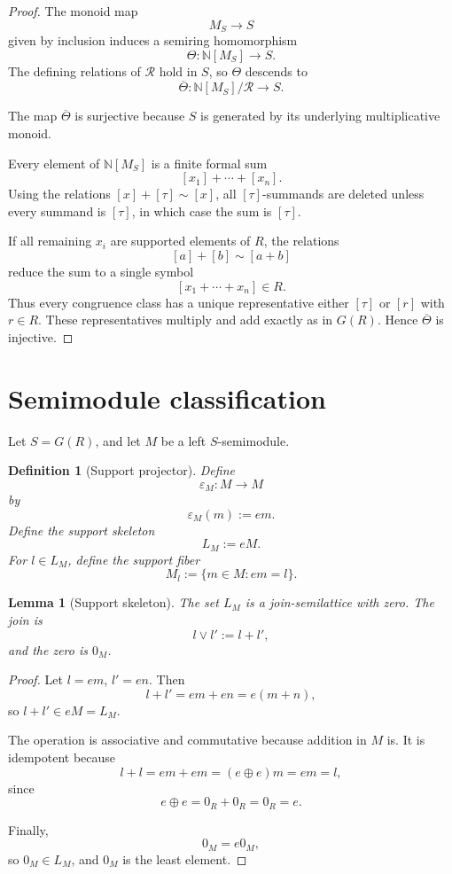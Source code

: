 \documentclass[11pt]{article}
\newtheorem{lemma}[theorem]{Lemma}
\newtheorem{definition}[theorem]{Definition}
\newcommand{\NN}{\mathbb N}
\begin{document}
\begin{proof}
The monoid map
\[
M_S\to S
\]
given by inclusion induces a semiring homomorphism
\[
\Theta:\NN[M_S]\to S.
\]
The defining relations of \(\mathcal R\) hold in \(S\), so \(\Theta\) descends to
\[
\overline\Theta:\NN[M_S]/\mathcal R\to S.
\]

The map \(\overline\Theta\) is surjective because \(S\) is generated by its underlying multiplicative monoid.

Every element of \(\NN[M_S]\) is a finite formal sum
\[
[x_1]+\cdots+[x_n].
\]
Using the relations \([x]+[\tau]\sim[x]\), all \([\tau]\)-summands are deleted unless every summand is \([\tau]\), in which case the sum is \([\tau]\).

If all remaining \(x_i\) are supported elements of \(R\), the relations
\[
[a]+[b]\sim[a+b]
\]
reduce the sum to a single symbol
\[
[x_1+\cdots+x_n]\in R.
\]
Thus every congruence class has a unique representative either \([\tau]\) or \([r]\) with \(r\in R\). These representatives multiply and add exactly as in \(G(R)\). Hence \(\overline\Theta\) is injective.
\end{proof}

\section{Semimodule classification}

Let \(S=G(R)\), and let \(M\) be a left \(S\)-semimodule.

\begin{definition}[Support projector]
Define
\[
\varepsilon_M:M\to M
\]
by
\[
\varepsilon_M(m):=em.
\]
Define the support skeleton
\[
L_M:=eM.
\]
For \(l\in L_M\), define the support fiber
\[
M_l:=\{m\in M:em=l\}.
\]
\end{definition}

\begin{lemma}[Support skeleton]
The set \(L_M\) is a join-semilattice with zero. The join is
\[
l\vee l':=l+l',
\]
and the zero is \(0_M\).
\end{lemma}

\begin{proof}
Let \(l=em\), \(l'=en\). Then
\[
l+l'=em+en=e(m+n),
\]
so \(l+l'\in eM=L_M\).

The operation is associative and commutative because addition in \(M\) is. It is idempotent because
\[
l+l=em+em=(e\oplus e)m=em=l,
\]
since
\[
e\oplus e=0_R+0_R=0_R=e.
\]

Finally,
\[
0_M=e0_M,
\]
so \(0_M\in L_M\), and \(0_M\) is the least element.
\end{proof}
\end{document}
